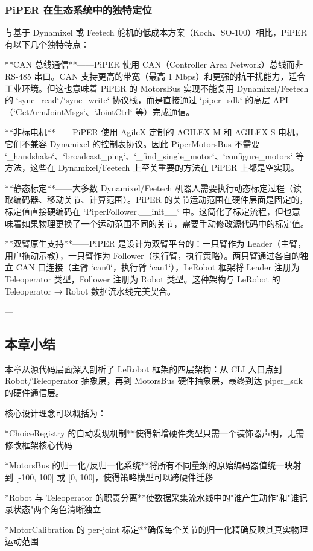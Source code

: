 \documentclass[UTF8,a4paper,11pt]{ctexart}
\begin{document}
\subsubsection{PiPER 在生态系统中的独特定位}

与基于 Dynamixel 或 Feetech 舵机的低成本方案（Koch、SO-100）相比，PiPER 有以下几个独特特点：

\item[1] **CAN 总线通信**——PiPER 使用 CAN（Controller Area Network）总线而非 RS-485 串口。CAN 支持更高的带宽（最高 1 Mbps）和更强的抗干扰能力，适合工业环境。但这也意味着 PiPER 的 MotorsBus 实现不能复用 Dynamixel/Feetech 的 `sync_read`/`sync_write` 协议栈，而是直接通过 `piper_sdk` 的高层 API（`GetArmJointMsgs`、`JointCtrl` 等）完成通信。

\item[2] **非标电机**——PiPER 使用 AgileX 定制的 AGILEX-M 和 AGILEX-S 电机，它们不兼容 Dynamixel 的控制表协议。因此 PiperMotorsBus 不需要 `_handshake`、`broadcast_ping`、`_find_single_motor`、`configure_motors` 等方法，这些在 Dynamixel/Feetech 上至关重要的方法在 PiPER 上都是空实现。

\item[3] **静态标定**——大多数 Dynamixel/Feetech 机器人需要执行动态标定过程（读取编码器、移动关节、计算范围）。PiPER 的关节运动范围在硬件层面是固定的，标定值直接硬编码在 `PiperFollower.__init__` 中。这简化了标定流程，但也意味着如果物理更换了一个运动范围不同的关节，需要手动修改源代码中的标定值。

\item[4] **双臂原生支持**——PiPER 是设计为双臂平台的：一只臂作为 Leader（主臂，用户拖动示教），一只臂作为 Follower（执行臂，执行策略）。两只臂通过各自的独立 CAN 口连接（主臂 `can0`，执行臂 `can1`），LeRobot 框架将 Leader 注册为 Teleoperator 类型，Follower 注册为 Robot 类型。这种架构与 LeRobot 的 Teleoperator → Robot 数据流水线完美契合。

---

\subsection{本章小结}

本章从源代码层面深入剖析了 LeRobot 框架的四层架构：从 CLI 入口点到 Robot/Teleoperator 抽象层，再到 MotorsBus 硬件抽象层，最终到达 piper_sdk 的硬件通信层。

核心设计理念可以概括为：

\item **ChoiceRegistry 的自动发现机制**使得新增硬件类型只需一个装饰器声明，无需修改框架核心代码
\item **MotorsBus 的归一化/反归一化系统**将所有不同量纲的原始编码器值统一映射到 [-100, 100] 或 [0, 100]，使得策略模型可以跨硬件迁移
\item **Robot 与 Teleoperator 的职责分离**使数据采集流水线中的"谁产生动作"和"谁记录状态"两个角色清晰独立
\item **MotorCalibration 的 per-joint 标定**确保每个关节的归一化精确反映其真实物理运动范围
\end{document}
